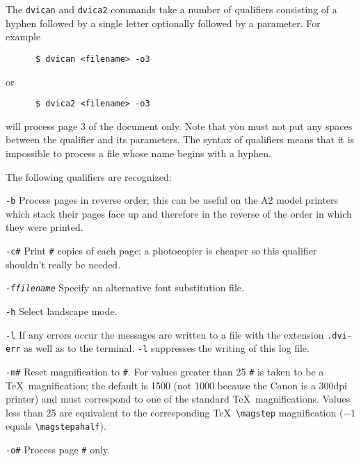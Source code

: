 The \verb+dvican+ and \verb+dvica2+ commands take a number of qualifiers consisting 
of a hyphen followed by a single letter optionally followed by a parameter. 
For example
\begin{verbatim}
      $ dvican <filename> -o3
\end{verbatim}
or 
\begin{verbatim}
      $ dvica2 <filename> -o3
\end{verbatim}
will process page 3 of the document only.
Note that you must not put any spaces between the qualifier and its
parameters.
The syntax of qualifiers means that it is impossible to process a file whose
name begins with a hyphen.

The following qualifiers are recognized:

\begin{list}{}{\settowidth{\labelwidth}{\tt-f\em filename}
\setlength{\leftmargin}{\labelwidth}
\addtolength{\labelwidth}{\labelsep}}

\item[\tt-b] Process pages in reverse order; this can be useful on the A2 model
printers which stack their pages face up and therefore in the reverse of
the order in which they were printed.

\item[\tt-c\#]  Print {\tt\#} copies of each page; a photocopier is cheaper so
this qualifier shouldn't really be needed.

\item[\tt-f\it filename] Specify an alternative font substitution file.

\item[\tt-h] Select landscape mode.

\item[\tt-l] If any errors occur the messages are written to a file with
the extension {\tt .dvi-err} as well as to the terminal. {\tt-l} suppresses
the writing of this log file.

\item[\tt-m\#] Reset magnification to {\tt\#}. For values greater than 25
{\tt\#} is taken to be a \TeX\ magnification; the default is 1500 (not 1000
because the Canon is a 300dpi printer) and must correspond to one of the
standard \TeX\ magnifications. Values less than 25 are equivalent to the
corresponding \TeX\ \verb+\magstep+ magnification ($-1$ equals
\verb+\magstepahalf+).

\item[\tt-o\#] Process page {\tt\#} only.


\end{list}
